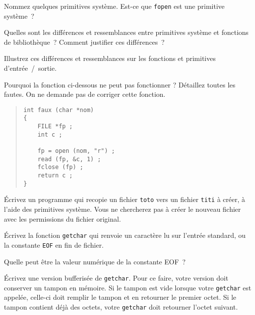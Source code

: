 %


% 


\question

Nommez quelques primitives système. Est-ce que {\tt fopen} est une
primitive système~?

Quelles sont les différences et ressemblances entre
primitives système et fonctions de bibliothèque~?
Comment justifier ces différences~?

Illustrez ces différences et ressemblances sur les
fonctions et primitives d'entrée~/~sortie.


\question

Pourquoi la fonction ci-dessous ne peut pas fonctionner ?  Détaillez
toutes les fautes.  On ne demande pas de corriger cette fonction.

\begin {quote}
\small
\begin {verbatim}
int faux (char *nom)
{
    FILE *fp ;
    int c ;

    fp = open (nom, "r") ;
    read (fp, &c, 1) ;
    fclose (fp) ;
    return c ;
}
\end{verbatim}
\end {quote}


\question
    \label {cp}

Écrivez un programme qui recopie un fichier {\tt toto} vers un fichier
{\tt titi} à créer, à l'aide des primitives système.
Vous ne chercherez
pas à créer le nouveau fichier avec les permissions du fichier original.


\question

Écrivez la fonction {\tt getchar} qui renvoie un caractère lu
sur l'entrée standard, ou la constante {\tt EOF} en fin de
fichier.

Quelle peut être la valeur numérique de la constante EOF~?


\question
    \label {getchar}

Écrivez une version bufferisée de {\tt getchar}. Pour ce faire, votre
version doit conserver un tampon en mémoire. Si le tampon est vide
lorsque votre \texttt {getchar} est appelée, celle-ci doit remplir le
tampon et en retourner le premier octet. Si le tampon contient déjà
des octets, votre \texttt {getchar} doit retourner l'octet suivant.


